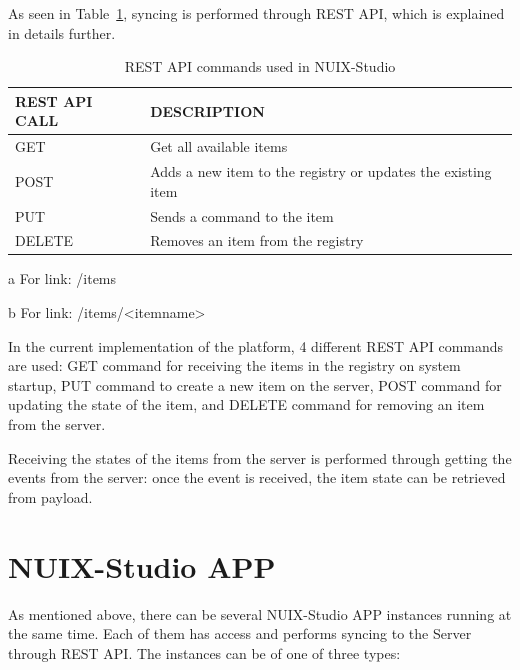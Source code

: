 As seen in Table~\ref{tab:three-part-table}, syncing is performed through REST API, which is explained in details further.

\begin{table}
  \centering
  \begin{threeparttable}[c]
    \caption{REST API commands used in NUIX-Studio}
    \label{tab:three-part-table}
    \begin{tabular}{ll}
      \toprule
      REST API CALL    &         DESCRIPTION                 \\
      \midrule
      GET\tnote{a} & Get all available items \\
      POST\tnote{b} & Adds a new item to the registry or updates the existing item    \\
      PUT\tnote{b}        & Sends a command to the item                              \\
      DELETE\tnote{b}        & Removes an item from the registry          \\
      \bottomrule
    \end{tabular}
    \begin{tablenotes}
      \item [a] For link: /items
      \item [b] For link: /items/<itemname>
    \end{tablenotes}
  \end{threeparttable}
\end{table}

In the current implementation of the platform, 4 different REST API commands are used: GET command for receiving the items in the registry on system startup, PUT command to create a new item on the server, POST command for updating the state of the item, and DELETE command for removing an item from the server.

Receiving the states of the items from the server is performed through getting the events from the server: once the event is received, the item state can be retrieved from payload.

\section{NUIX-Studio APP}

As mentioned above, there can be several NUIX-Studio APP instances running at the same time. Each of them has access and performs syncing to the Server through REST API. The instances can be of one of three types:

